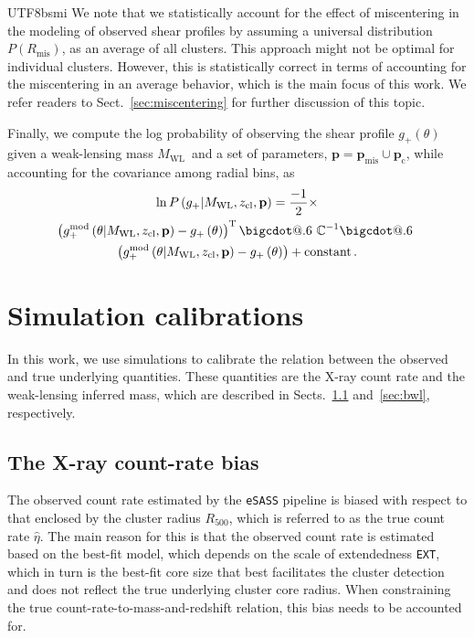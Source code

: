 \documentclass[longauth]{aa}
\makeatletter
\newcommand{\Rfiveoo}{\ensuremath{R_{500}}}
\newcommand{\zcl}{\ensuremath{z_{\mathrm{cl}}}}
\newcommand{\gshear}{\ensuremath{g_{+}}}
\newcommand{\Mwl}{\ensuremath{M_{\mathrm{WL}}}}
\newcommand{\truerate}{\ensuremath{\hat\eta}}
\newcommand*\bigcdot{\mathpalette\bigcdot@{.6}}
\newcommand*\bigcdot@[2]{\mathbin{\vcenter{\hbox{\scalebox{#2}{$\m@th#1\bullet$}}}}}
\makeatother
\begin{document}
\begin{CJK*}{UTF8}{bsmi}
We note that we statistically account for the effect of miscentering in the modeling of observed shear profiles by assuming a universal distribution $P\left(R_{\mathrm{mis}}\right)$, as an average of all clusters.
This approach might not be optimal for individual clusters.
However, this is statistically correct in terms of accounting for the miscentering in an average behavior, which is the main focus of this work.
We refer readers to Sect.~\ref{sec:miscentering} for further discussion of this topic.

Finally, we compute the log probability of observing the shear profile $\gshear\left(\theta\right)$ given a weak-lensing mass \Mwl\ and a set of parameters,
$\mathbf{p} = \mathbf{p}_{\mathrm{mis}}\cup\mathbf{p}_{\mathrm{c}}$, 
while accounting for the covariance among radial bins, as
%
\begin{multline}
\label{eq:chi2}
\ln P\left(\gshear|\Mwl, \zcl, \mathbf{p}\right)
= \frac{-1}{2}
\times
\\
\left(
g_{+}^{\mathrm{mod}}\left(
\theta|\Mwl, \zcl, \mathbf{p}
\right)
 - \gshear\left(\theta\right)
\right)^{\mathrm{T}}
\bigcdot~
\mathbb{C}^{-1}
\bigcdot~
\\
\left(
g_{+}^{\mathrm{mod}}\left(
\theta|\Mwl, \zcl, \mathbf{p}
\right)
 - \gshear\left(\theta\right)
\right) + \mathrm{constant}
\,  .
\end{multline}
%



%
%



\section{Simulation calibrations}
\label{sec:simulations}

In this work, we use simulations to calibrate the relation between the observed and true underlying quantities.
These quantities are the X-ray count rate and the weak-lensing inferred mass, which are described in Sects.~\ref{sec:etabias} and~\ref{sec:bwl}, respectively.


\subsection{The X-ray count-rate bias}
\label{sec:etabias}


The observed count rate estimated by the \texttt{eSASS} pipeline is biased with respect to that enclosed by the cluster radius \Rfiveoo, which is referred to as the true count rate \truerate.
The main reason for this is that the observed count rate is estimated 
based on the best-fit model, which depends on the scale of extendedness \texttt{EXT}, which in turn is the best-fit core size that best facilitates the cluster detection and does not reflect the true underlying cluster core radius.
When constraining the true count-rate-to-mass-and-redshift relation, this bias needs to be accounted for.



\end{CJK*}
\end{document}
